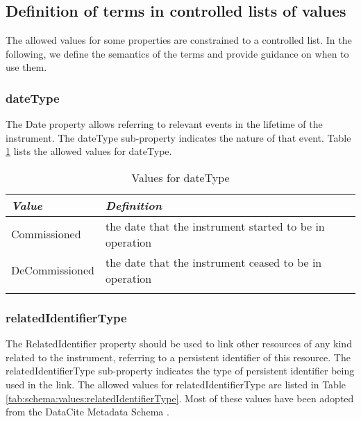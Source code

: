 \documentclass[titlepage=true,twoside=false,DIV=13]{scrartcl}
\begin{document}
\subsection{Definition of terms in controlled lists of values}

The allowed values for some properties are constrained to a controlled
list.  In the following, we define the semantics of the terms and
provide guidance on when to use them.

\newlength{\valnamecolw}\settowidth{\valnamecolw}{IsPreviousVersionOf}
\newlength{\valdefcolw}
\setlength{\valdefcolw}{\textwidth}
\addtolength{\valdefcolw}{-\valnamecolw}
\addtolength{\valdefcolw}{-4\tabcolsep}

\subsubsection{dateType}

The Date property allows referring to relevant events in the lifetime
of the instrument.  The dateType sub-property indicates the nature of
that event.  Table \ref{tab:schema:values:dateType} lists the allowed
values for dateType.

\begin{longtable}{|l|l|}
  \hline
  \emph{Value} & \emph{Definition} \\
  \hline \endhead
  \hline \endfoot\endlastfoot
  Commissioned   & the date that the instrument started to be in operation \\
  DeCommissioned & the date that the instrument ceased to be in operation \\
  \hline
  \caption{Values for dateType}
  \label{tab:schema:values:dateType}
\end{longtable}

\subsubsection{relatedIdentifierType}

The RelatedIdentifier property should be used to link other resources
of any kind related to the instrument, referring to a persistent
identifier of this resource.  The relatedIdentifierType sub-property
indicates the type of persistent identifier being used in the link.
The allowed values for relatedIdentifierType are listed in Table
\ref{tab:schema:values:relatedIdentifierType}.  Most of these values
have been adopted from the DataCite Metadata Schema
\cite{datacite:schema}.
\end{document}
